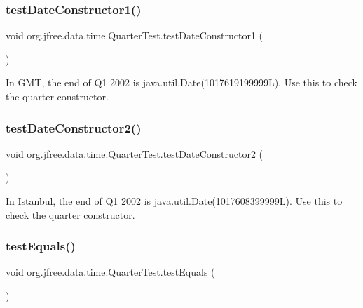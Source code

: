 \subsubsection{\texorpdfstring{test\+Date\+Constructor1()}{testDateConstructor1()}}
{\footnotesize\ttfamily void org.\+jfree.\+data.\+time.\+Quarter\+Test.\+test\+Date\+Constructor1 (\begin{DoxyParamCaption}{ }\end{DoxyParamCaption})}

In G\+MT, the end of Q1 2002 is java.\+util.\+Date(1017619199999\+L). Use this to check the quarter constructor. \mbox{\label{classorg_1_1jfree_1_1data_1_1time_1_1_quarter_test_afa26a4a1870157425a8657de72397cc2}} 
\subsubsection{\texorpdfstring{test\+Date\+Constructor2()}{testDateConstructor2()}}
{\footnotesize\ttfamily void org.\+jfree.\+data.\+time.\+Quarter\+Test.\+test\+Date\+Constructor2 (\begin{DoxyParamCaption}{ }\end{DoxyParamCaption})}

In Istanbul, the end of Q1 2002 is java.\+util.\+Date(1017608399999\+L). Use this to check the quarter constructor. \mbox{\label{classorg_1_1jfree_1_1data_1_1time_1_1_quarter_test_ae6d9d8c92c19937ea5e04d3eb1ff196f}} 
\subsubsection{\texorpdfstring{test\+Equals()}{testEquals()}}
{\footnotesize\ttfamily void org.\+jfree.\+data.\+time.\+Quarter\+Test.\+test\+Equals (\begin{DoxyParamCaption}{ }\end{DoxyParamCaption})}

